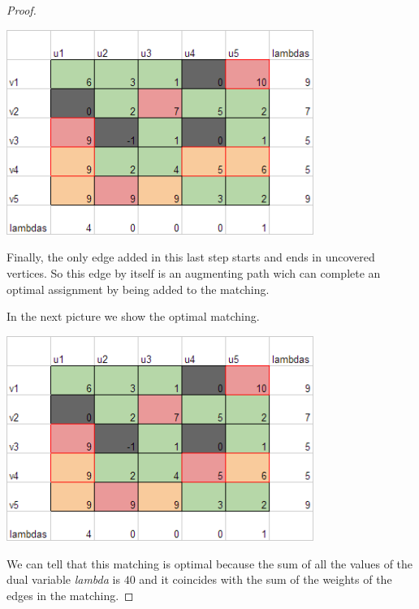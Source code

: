 \begin{proof}
    \begin{center}
        \includegraphics[width=10cm]{OptimalAssignmentExample/OptimalAssignment4.png}
    \end{center}\pn

    Finally, the only edge added in this last step starts and ends in uncovered
    vertices. So this edge by itself is an augmenting path wich can complete
    an optimal assignment by being added to the matching.\pn
    
    In the next picture we show the optimal matching.\pn

    \begin{center}
        \includegraphics[width=10cm]{OptimalAssignmentExample/OptimalAssignment5.png}
    \end{center}
    
    We can tell that this matching is optimal because the sum of all the
    values of the dual variable \textit{lambda} is $40$ and it coincides with
    the sum of the weights of the edges in the matching.
\end{proof}